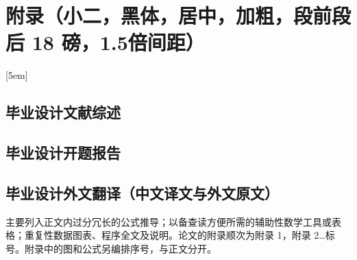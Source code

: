 \chapter{附录（小二，黑体，居中，加粗，段前段后 18 磅，1.5倍间距）}
{%
[5em]{}{\contentslabel{3.5em}}{}{}
\section{毕业设计文献综述}
\section{毕业设计开题报告}
\section{毕业设计外文翻译（中文译文与外文原文）}

主要列入正文内过分冗长的公式推导；以备查读方便所需的辅助性数学工具或表格；重复性数据图表、程序全文及说明。论文的附录顺次为附录 1，附录 2…标号。附录中的图和公式另编排序号，与正文分开。
}
